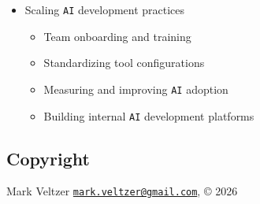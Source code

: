 \documentclass[
]{article}
\providecommand{\tightlist}{%
  \setlength{\itemsep}{0pt}\setlength{\parskip}{0pt}}
\begin{document}
\begin{itemize}
\begin{itemize}
    \begin{itemize}
    \tightlist
    \item
      Code ownership and \texttt{AI}-generated code
    \item
      License implications
    \item
      Audit trails and reproducibility
    \item
      Organizational policies
    \end{itemize}
  \item
    Scaling \texttt{AI} development practices

    \begin{itemize}
    \tightlist
    \item
      Team onboarding and training
    \item
      Standardizing tool configurations
    \item
      Measuring and improving \texttt{AI} adoption
    \item
      Building internal \texttt{AI} development platforms
    \end{itemize}
  \end{itemize}
\end{itemize}

\subsection{Copyright}\label{copyright}

Mark Veltzer
\href{mailto:mark.veltzer@gmail.com}{\nolinkurl{mark.veltzer@gmail.com}},
© 2026
\end{document}
